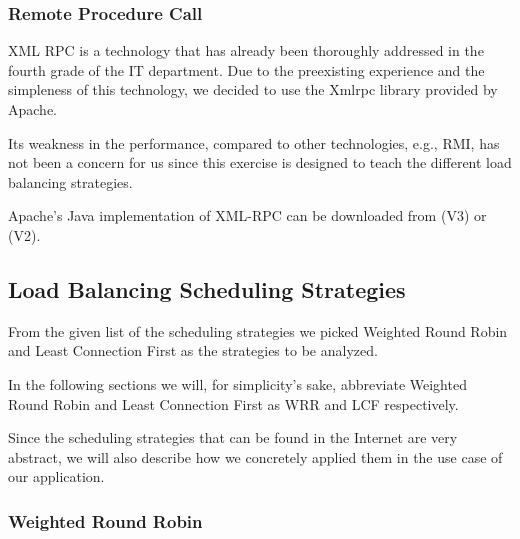 \documentclass[11pt, a4paper]{article}
\begin{document}
\subsubsection{Remote Procedure Call}

XML RPC is a technology that has already been thoroughly addressed in
the fourth grade of the IT department. Due to the preexisting
experience and the simpleness of this technology, we decided to use
the Xmlrpc library provided by Apache.

Its weakness in the performance, compared to other technologies, e.g.,
RMI, has not been a concern for us since this exercise is designed to
teach the different load balancing strategies. 

Apache's Java implementation of XML-RPC can be downloaded from \cite{xmlrpc-v3} (V3) or \cite{xmlrpc-v2} (V2).

\subsection{Load Balancing Scheduling Strategies}
\label{subsec:strategy}
From the given list of the scheduling strategies we picked Weighted
Round Robin and Least Connection First as the strategies to be
analyzed.

In the following sections we will, for simplicity's sake, abbreviate
Weighted Round Robin and Least Connection First as WRR and LCF
respectively.

Since the scheduling strategies that can be found in the Internet are
very abstract, we will also describe how we concretely applied them in
the use case of our application. 

\subsubsection{Weighted Round Robin}
\end{document}
